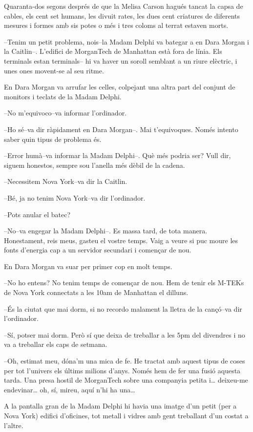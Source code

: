 Quaranta-dos segons després de que la Melisa Carson hagués tancat la
capsa de cables, els cent set humans, les divuit rates, les dues cent
criatures de diferents mesures i formes amb sis potes o més i tres
coloms al terrat estaven morts.

--Tenim un petit problema, nois--la Madam Delphi va bategar a en Dara
Morgan i la Caitlin--. L'edifici de MorganTech de Manhattan està fora de
línia. Els terminals estan terminals-- hi va haver un soroll semblant a
un riure elèctric, i unes ones movent-se al seu ritme.

En Dara Morgan va arrufar les celles, colpejant una altra part del
conjunt de monitors i teclats de la Madam Delphi.

--No m'equivoco--va informar l'ordinador.

--Ho sé--va dir ràpidament en Dara Morgan--. Mai t'equivoques. Només
intento saber quin tipus de problema és.

--Error humà--va informar la Madam Delphi--. Què més podria ser? Vull
dir, siguem honestos, sempre sou l'anella més dèbil de la cadena.

--Necessitem Nova York--va dir la Caitlin.

--Bé, ja no tenim Nova York--va dir l'ordinador.

--Pots anular el batec?

--No--va engegar la Madam Delphi--. Es massa tard, de tota manera.
Honestament, reis meus, gasteu el vostre temps. Vaig a veure si puc
moure les fonts d'energia cap a un servidor secundari i començar de nou.

En Dara Morgan va suar per primer cop en molt temps.

--No ho entens? No tenim temps de començar de nou. Hem de tenir els
M-TEKs de Nova York connectats a les 10am de Manhattan el dilluns.

--És la ciutat que mai dorm, si no recordo malament la lletra de la
cançó--va dir l'ordinador.

--Sí, potser mai dorm. Però sí que deixa de treballar a les 5pm del
divendres i no va a treballar els caps de setmana.

--Oh, estimat meu, dóna'm una mica de fe. He tractat amb aquest tipus de
coses per tot l'univers els últims milions d'anys. Només hem de fer una
fusió aquesta tarda. Una presa hostil de MorganTech sobre una companyia
petita i\ldots{} deixeu-me endevinar\ldots{} oh, sí, mireu, aquí n'hi ha
una\ldots{}

A la pantalla gran de la Madam Delphi hi havia una imatge d'un petit
(per a Nova York) edifici d'oficines, tot metall i vidres amb gent
treballant d'un costat a l'altre.

